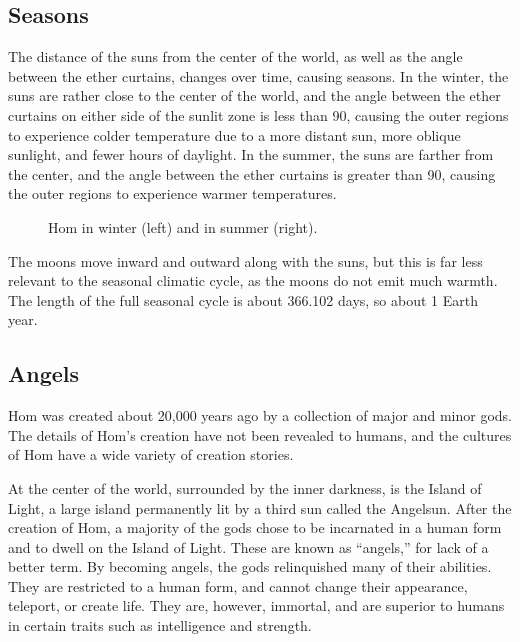 \documentclass{article}
\begin{document}
\subsection{Seasons}

The distance of the suns from the center of the world, as well as the angle between the ether curtains, changes over time, causing seasons. In the winter, the suns are rather close to the center of the world, and the angle between the ether curtains on either side of the sunlit zone is less than 90\degree, causing the outer regions to experience colder temperature due to a more distant sun, more oblique sunlight, and fewer hours of daylight. In the summer, the suns are farther from the center, and the angle between the ether curtains is greater than 90\degree, causing the outer regions to experience warmer temperatures.

\begin{figure}[h]
  \centering
  
  \quad
  
  \caption{Hom in winter (left) and in summer (right).}
\end{figure}

The moons move inward and outward along with the suns, but this is far less relevant to the seasonal climatic cycle, as the moons do not emit much warmth. The length of the full seasonal cycle is about 366.102 days, so about 1 Earth year.

\subsection{Angels}


Hom was created about 20,000 years ago by a collection of major and minor gods. The details of Hom's creation have not been revealed to humans, and the cultures of Hom have a wide variety of creation stories.

At the center of the world, surrounded by the inner darkness, is the Island of Light, a large island permanently lit by a third sun called the Angelsun. After the creation of Hom, a majority of the gods chose to be incarnated in a human form and to dwell on the Island of Light. These are known as ``angels,'' for lack of a better term. By becoming angels, the gods relinquished many of their abilities. They are restricted to a human form, and cannot change their appearance, teleport, or create life. They are, however, immortal, and are superior to humans in certain traits such as intelligence and strength.
\end{document}

